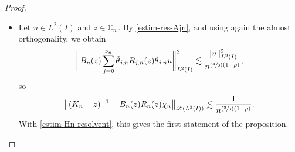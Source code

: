 \documentclass[11pt]{article}
\numberwithin{equation}{section}
\let\mathcal\mathscr
\newcommand{\Psfrac}[2]{(\sfrac{#1}{#2})}
\newcommand{\psfrac}[2]{\sfrac{(#1)}{#2}}
\theoremstyle{plain}
\theoremstyle{definition}
\newcommand {\limt}[2]{\xrightarrow[#1 \to #2]{}}
\newcommand{\abs}[1]{\vert #1\vert}
\newcommand{\nr}[1]{\Vert #1\Vert}
\newcommand{\bnr}[1]{\bigl\Vert #1\bigr\Vert}
\newcommand{\bbnr}[1]{\biggl\Vert #1\biggr\Vert}
\newcommand{\Ii}[2] {\left\{ #1,\dots,#2 \right\}}
\newcommand{\inv}{^{-1}}
\newcommand{\1}{\mathds 1}
\newcommand{\Dom}{\mathsf{Dom}}
\newcommand{\R}{\mathbb{R}}
\def\C{\mathbb{C}}
\newcommand{\N}{\mathbb{N}}
\let\d\delta
\let\th\theta
\let\h\chi
\newcommand{\Lc}{{\mathcal L}}
\begin{document}
\begin{proof}
\begin{itemize}
Let $\tilde \th \in C_0^\infty(\R,[0,1])$ be equal to 1 on $\big[-\sfrac 23,\sfrac 23\big]$ and supported in $]-1,1[$. Then for $n \in \N^*$, $j \in \Ii 1 {\nu_n}$ and $y \in \bar I$ we set
\[
\tilde \th_{j,n}(y) = \tilde \th \bigl(\psfrac {y-a_{j,n}}{\d_n} \bigr),
\]
and then
\begin{equation} \label{eq_def_Qn}
Q_n(z) = R_n(z) \h_n + \sum_{j=0}^{\nu_n} \tilde \theta_{j,n} R_{j,n}(z) \theta_{j,n}.
\end{equation}
For $u \in \Dom(K_n)$ and $z \in \C_n^-$ we have $\th_{j,n} u = \th_{j,n} \tilde \th_{j,n} u$ and
\[
\theta_{j,n} (K_n-z) (1- \tilde \theta_{j,n}) u = 0,
\]
so
\[
\nr{Q_n(z) (K_n-z) u - u }_{L^2(I)} \leq \nr{T_n(z) u}_{L^2(I)} + \bbnr{\sum_{j=0}^{\nu_n} \tilde \th_{j,n} T_{j,n}(z) \tilde \th_{j,n} u}_{L^2(I)}.
\]
Moreover $\tilde \th_{j,n} \tilde \th_{k,n} = 0$ whenever $\abs{j-k} \geq 2$, so by almost orthogonaly (twice) we can write
\begin{align*}
\bbnr{\sum_{j=0}^{\nu_n} \tilde \th_{j,n} T_{j,n}(z) \tilde \th_{j,n} u}^2_{L^2(I)}
& \lesssim \sum_{j=0}^{\nu_n} \nr{\tilde \th_{j,n} T_{j,n}(z) \tilde \th_{j,n} u}^2_{L^2(I)}\\
& \lesssim \sup_{0\leq j \leq \nu_n} \nr{T_{j,n}(z)}_{\Lc(L^2(I))}^2 \sum_{j=0}^{\nu_n} \nr{\tilde \th_{j,n} u}^2_{L^2(I)}\\
& \lesssim \sup_{0\leq j \leq \nu_n} \nr{T_{j,n}(z)}_{\Lc(L^2(I))}^2\, \nr{u}^2_{L^2(I)}.
\end{align*}
This proves
\begin{equation} \label{eq-Qn-Kn-z}
\sup_{z \in \C_n^-} \sup_{\substack{u \in \Dom(K_n)\\ \nr{u}_{L^2(I)} = 1}} \nr{Q_n(z) (K_n-z) u - u}_{L^2(I)} \limt n {+\infty} 0.
\end{equation}
Thus for $n$ large enough the operator $K_n$ has no eigenvalue and hence no spectrum in $\C_n^-$. Moreover for $z \in \C_n^-$ we have
\begin{equation} \label{eq-Qngoodapprox}
(K_n-z)\inv = B_n(z) Q_n(z),
\end{equation}
where
\[
B_n(z) = \bigl(1 + \bigl(Q_n(z) (K_n-z) - 1 \bigr) \bigr)\inv
\]
is bounded on $L^2(I)$ uniformly in $z \in \C_n^-$ and $n$ large enough.

\item
Let $u \in L^2(I)$ and $z \in \mathbb{C}_n^-$. By \eqref{estim-res-Ajn}, and using again the almost orthogonality, we obtain
\[
\bbnr{B_n(z) \sum_{j=0}^{\nu_n} \tilde \theta_{j,n} R_{j,n}(z) \theta_{j,n} u}^2_{L^2(I)} \lesssim \frac {\nr{u}^2_{L^2(I)}}{n ^{\Psfrac 43(1-\rho)}},
\]
so
\begin{equation} \label{eq-res-Kn-Rn}
\bnr{(K_n-z)\inv - B_n(z) R_n(z) \h_n }_{\Lc(L^2(I))} \lesssim \frac 1 {n^{\Psfrac 23(1-\rho)}}.
\end{equation}
With \eqref{estim-Hn-resolvent}, this gives the first statement of the proposition.


\end{itemize}
\end{proof}
\end{document}
